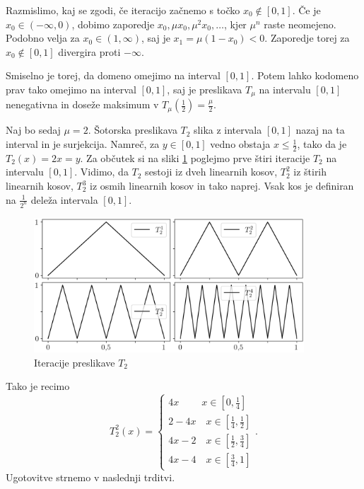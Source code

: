 \documentclass{isrmdelo}
\begin{document}
Razmislimo, kaj se zgodi, če iteracijo začnemo s točko $x_0 \notin [0,1]$. Če je $x_0 \in (-\infty, 0)$, dobimo zaporedje $x_0, \mu x_0, \mu^2 x_0, \dots$, kjer $\mu^n$ raste neomejeno. Podobno velja za $x_0 \in (1, \infty)$, saj je $x_1 = \mu(1-x_0) < 0$. Zaporedje torej za $x_0 \notin [0,1]$ divergira proti $-\infty$. 

Smiselno je torej, da domeno omejimo na interval $[0,1]$. Potem lahko kodomeno prav tako omejimo na interval $[0,1]$, saj je preslikava $T_{\mu}$ na intervalu $[0,1]$ nenegativna in doseže maksimum v $T_\mu(\frac{1}{2}) = \frac{\mu}{2}$.

\medskip

Naj bo sedaj $\mu = 2$. Šotorska preslikava $T_2$ slika z intervala $[0, 1]$ nazaj na ta interval in je surjekcija. Namreč, za $y \in [0,1]$ vedno obstaja $x \leq \frac{1}{2}$, tako da je $T_2(x) = 2x = y$. Za občutek si na sliki \ref{pic:tent-2} poglejmo prve štiri iteracije $T_2$ na intervalu $[0,1]$. Vidimo, da $T_2$ sestoji iz dveh linearnih kosov, $T_2^2$ iz štirih linearnih kosov, $T_2^3$ iz osmih linearnih kosov in tako naprej. Vsak kos je definiran na $\frac{1}{2^n}$ deleža intervala $[0,1]$.

\begin{figure}[h!]
\begin{center}
\includegraphics[width=0.9\textwidth]{img/tent_2.png}
\end{center}
\caption{Iteracije preslikave $T_2$}
\label{pic:tent-2}
\end{figure}

Tako je recimo
\begin{equation*}
T_2^2(x) =
\begin{cases}
4x\phantom{-2} \quad x \in [0, \frac{1}{4}] \\
2-4x \quad x \in [\frac{1}{4}, \frac{1}{2}] \\
4x-2 \quad x \in [\frac{1}{2}, \frac{3}{4}] \\
4x-4 \quad x \in [\frac{3}{4}, 1]
\end{cases}.
\end{equation*}
Ugotovitve strnemo v naslednji trditvi.
\end{document}
